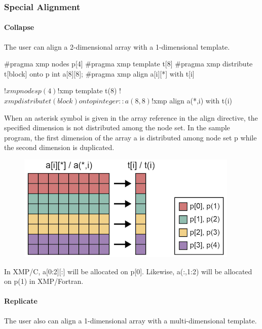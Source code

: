 \subsubsection{Special Alignment}

\paragraph{Collapse}

The user can align a 2-dimensional array with a 1-dimensional template.

\begin{XCexample}
#pragma xmp nodes p[4]
#pragma xmp template t[8]
#pragma xmp distribute t[block] onto p
int a[8][8];
#pragma xmp align a[i][*] with t[i]
\end{XCexample}

\begin{XFexample}
!$xmp nodes p(4)
!$xmp template t(8)
!$xmp distribute t(block) onto p
integer :: a(8,8)
!$xmp align a(*,i) with t(i)
\end{XFexample}

When an asterisk symbol is given in the array reference in the align
directive, the specified dimension is not distributed among the node
set. In the sample program, the first dimension of the array a is
distributed among node set p while the second dimension is duplicated.

\begin{figure}
  \centering
  \includegraphics{figs/collapse.png}
\end{figure}

In XMP/C, a[0:2][:] will be allocated on p[0]. Likewise, a(:,1:2) will
be allocated on p(1) in XMP/Fortran.

\paragraph{Replicate}

The user also can align a 1-dimensional array with a multi-dimensional
template.

